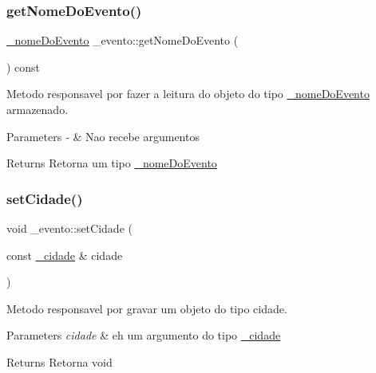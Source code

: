 \subsubsection{\texorpdfstring{getNomeDoEvento()}{getNomeDoEvento()}}
{\footnotesize\ttfamily \mbox{\hyperlink{class__nome_do_evento}{\+\_\+nome\+Do\+Evento}} \+\_\+evento\+::get\+Nome\+Do\+Evento (\begin{DoxyParamCaption}{ }\end{DoxyParamCaption}) const}



Metodo responsavel por fazer a leitura do objeto do tipo \mbox{\hyperlink{class__nome_do_evento}{\+\_\+nome\+Do\+Evento}} armazenado. 


\begin{DoxyParams}{Parameters}
{\em -\/} & Nao recebe argumentos \\
\hline
\end{DoxyParams}
\begin{DoxyReturn}{Returns}
Retorna um tipo \mbox{\hyperlink{class__nome_do_evento}{\+\_\+nome\+Do\+Evento}} 
\end{DoxyReturn}
\mbox{\label{class__evento_a9f84949e7ac520ff72d0c01d0f90a86d}} 
\subsubsection{\texorpdfstring{setCidade()}{setCidade()}}
{\footnotesize\ttfamily void \+\_\+evento\+::set\+Cidade (\begin{DoxyParamCaption}\item[{const \mbox{\hyperlink{class__cidade}{\+\_\+cidade}} \&}]{cidade }\end{DoxyParamCaption})}



Metodo responsavel por gravar um objeto do tipo cidade. 


\begin{DoxyParams}{Parameters}
{\em cidade} & eh um argumento do tipo \mbox{\hyperlink{class__cidade}{\+\_\+cidade}} \\
\hline
\end{DoxyParams}
\begin{DoxyReturn}{Returns}
Retorna void 
\end{DoxyReturn}
\mbox{\label{class__evento_a4c402e6c3c7b8cad8e693f080b8f399c}} 
